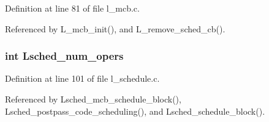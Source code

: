 Definition at line 81 of file l\_\-mcb.c.

Referenced by L\_\-mcb\_\-init(), and L\_\-remove\_\-sched\_\-cb().
\subsubsection{\setlength{\rightskip}{0pt plus 5cm}int \bf{Lsched\_\-num\_\-opers}}\label{l__mcb_8c_81a1b68006a09b691fdbe6e8d1fb354d}




Definition at line 101 of file l\_\-schedule.c.

Referenced by Lsched\_\-mcb\_\-schedule\_\-block(), Lsched\_\-postpass\_\-code\_\-scheduling(), and Lsched\_\-schedule\_\-block().